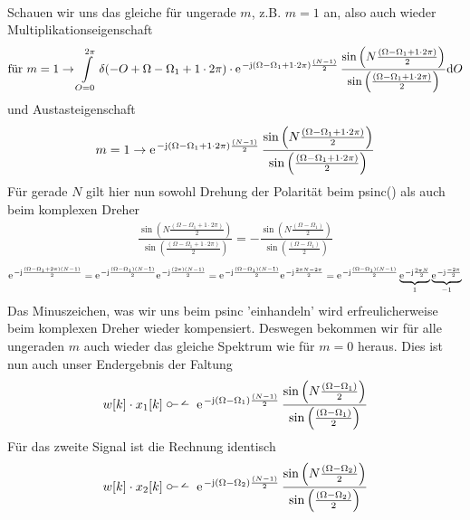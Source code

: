 \begin{ExCalc}
\begin{align}
\end{align}
%
Schauen wir uns das gleiche für ungerade $m$, z.B. $m=1$ an, also auch wieder
Multiplikationseigenschaft
\begin{align}
\text{für   }m=1\rightarrow
\int\limits_{O=0}^{2\pi}
\delta(-O+\Omega-\Omega_1+1\cdot2\pi)
\cdot
\e^{-\im(\Omega-\Omega_1 + 1\cdot2\pi)\frac{(N-1)}{2}}\,
\frac{\sin\left(N\frac{(\Omega-\Omega_1 + 1\cdot2\pi)}{2}\right)}{\sin\left(\frac{(\Omega-\Omega_1 + 1\cdot2\pi)}{2}\right)}\fsd O
\end{align}
und Austasteigenschaft
\begin{align}
m=1\rightarrow
\e^{-\im (\Omega-\Omega_1 + 1\cdot2\pi) \frac{(N-1)}{2}}\,
\frac{\sin\left(N\frac{(\Omega-\Omega_1 + 1\cdot2\pi)}{2}\right)}{\sin\left(\frac{(\Omega-\Omega_1 + 1\cdot2\pi)}{2}\right)}
\end{align}
Für gerade $N$ gilt hier nun sowohl Drehung der Polarität beim psinc() als auch beim komplexen Dreher
\begin{align}
\frac{\sin\left(N\frac{(\Omega-\Omega_1 + 1\cdot2\pi)}{2}\right)}{\sin\left(\frac{(\Omega-\Omega_1 + 1\cdot2\pi)}{2}\right)}
= -
\frac{\sin\left(N\frac{(\Omega-\Omega_1)}{2}\right)}{\sin\left(\frac{(\Omega-\Omega_1)}{2}\right)}
\end{align}
%
\begin{align}
\e^{-\im\frac{(\Omega-\Omega_1 + 2\pi)(N-1)}{2}}=
\e^{-\im\frac{(\Omega-\Omega_1)(N-1)}{2}}
\e^{-\im\frac{(2\pi)(N-1)}{2}}=
\e^{-\im\frac{(\Omega-\Omega_1)(N-1)}{2}}
\e^{-\im\frac{2\pi N -2\pi}{2}}=
\e^{-\im\frac{(\Omega-\Omega_1)(N-1)}{2}}
\underbrace{\e^{-\im\frac{2\pi N}{2}}}_{1}
\underbrace{\e^{-\im\frac{-2\pi}{2}}}_{-1}
\end{align}
Das Minuszeichen, was wir uns beim psinc 'einhandeln' wird erfreulicherweise
beim komplexen Dreher wieder kompensiert.  Deswegen bekommen wir für alle ungeraden $m$
auch wieder das gleiche Spektrum wie für $m=0$ heraus.
%
Dies ist nun auch unser Endergebnis der Faltung
\begin{align}
w[k] \cdot x_1[k]\dtft
\e^{-\im (\Omega-\Omega_1) \frac{(N-1)}{2}}\,
\frac{\sin\left(N\frac{(\Omega-\Omega_1)}{2}\right)}{\sin\left(\frac{(\Omega-\Omega_1)}{2}\right)}
\end{align}
Für das zweite Signal ist die Rechnung identisch
\begin{align}
w[k] \cdot x_2[k]\dtft
\e^{-\im (\Omega-\Omega_2) \frac{(N-1)}{2}}\,
\frac{\sin\left(N\frac{(\Omega-\Omega_2)}{2}\right)}{\sin\left(\frac{(\Omega-\Omega_2)}{2}\right)}
\end{align}
%
\end{ExCalc}

